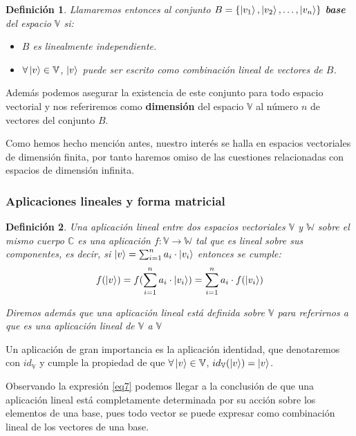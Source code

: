 \documentclass[a4paper]{article}
\newtheorem{deff}{Definición}[section]
\numberwithin{equation}{section}
\begin{document}
\begin{deff} Llamaremos entonces al conjunto $B = \{ \ket{v_1},\ket{v_2}, \ldots, \ket{v_n} \}$ \textbf{base} del espacio $\mathbb{V}$ si:
\begin{itemize}
\item $B$ es linealmente independiente.

\item $\forall \ket{v} \in \mathbb{V}$, $\ket{v}$ puede ser escrito como combinación lineal de vectores de $B$.
\end{itemize}
\end{deff}

Además podemos asegurar la existencia de este conjunto para todo espacio vectorial y  nos referiremos como \textbf{dimensión} del espacio $\mathbb{V}$ al número $n$ de vectores del conjunto $B$.

Como hemos hecho mención antes, nuestro interés se halla en espacios vectoriales de dimensión finita, por tanto haremos omiso de las cuestiones relacionadas con espacios de dimensión infinita.

\subsubsection{Aplicaciones lineales y forma matricial}

\begin{deff} Una aplicación lineal entre dos espacios vectoriales $\mathbb{V}$ y $\mathbb{W}$ sobre el mismo cuerpo $\mathbb{C}$ es una aplicación $f: \mathbb{V} \longrightarrow \mathbb{W}$ tal que es lineal sobre sus componentes, es decir, si $\ket{v} = \sum_{i=1}^n a_i \cdot \ket{v_i}$ entonces se cumple:
\begin{equation} \label{eq7}
f(\ket{v}) = f(\sum_{i=1}^n a_i \cdot \ket{v_i}) = \sum_{i=1}^n a_i \cdot f(\ket{v_i})
\end{equation}

Diremos además que una aplicación lineal está definida sobre $\mathbb{V}$ para referirnos a que es una aplicación lineal de $\mathbb{V}$ a $\mathbb{V}$
\end{deff}

Un aplicación de gran importancia es la aplicación identidad, que denotaremos con $id_{\mathbb{V}}$ y cumple la propiedad de que $\forall \ket{v}\in\mathbb{V}$, $id_{\mathbb{V}}(\ket{v}) = \ket{v}$.

Observando la expresión \ref{eq7} podemos llegar a la conclusión de que una aplicación lineal está completamente determinada por su acción sobre los elementos de una base, pues todo vector se puede expresar como combinación lineal de los vectores de una base.
\end{document}
